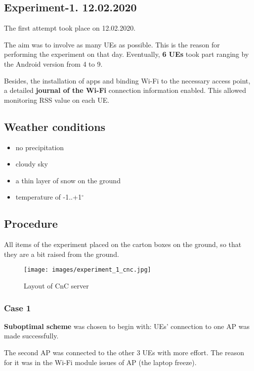 \subsection{Experiment-1. 12.02.2020}\label{experiment-1.-12.02.2020}

The first attempt took place on 12.02.2020.

The aim was to involve as many UEs as possible. This is the reason for performing the experiment on that day. Eventually, \textbf{6 UEs} took part ranging by the Android version from 4 to 9.

Besides, the installation of apps and binding Wi-Fi to the necessary
access point, a detailed \textbf{journal of the Wi-Fi} connection
information enabled. This allowed monitoring RSS value on each UE.

\subsection{Weather conditions}\label{weather-conditions}

\begin{itemize}
\tightlist
\item
  no precipitation
\item
  cloudy sky
\item
  a thin layer of snow on the ground
\item
  temperature of -1..+1$^\circ$
\end{itemize}

\subsection{Procedure}\label{procedure}

All items of the experiment placed on the carton boxes on the ground, so that they are a bit raised from the ground.

\begin{figure}[H]
	\centering
	\texttt{[image: images/experiment\_1\_cnc.jpg]}
\caption{Layout of CnC server}
\end{figure}

\subsubsection{Case 1}\label{case-1}

\textbf{Suboptimal scheme} was chosen to begin with: UEs' connection to one AP was made successfully.

The second AP was connected to the other 3 UEs with more effort. The reason for it was in the Wi-Fi module issues of AP  (the laptop freeze).


